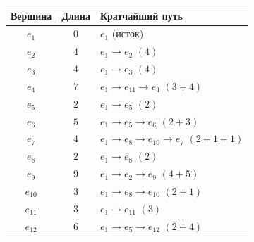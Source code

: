 \documentclass[a4paper,12pt]{article}
\begin{document}
\begin{center}
	\renewcommand{\arraystretch}{1.4}
	\begin{tabular}{|c|c|l|}
		\hline
		\textbf{Вершина} & \textbf{Длина} & \textbf{Кратчайший путь}                         \\
		\hline
		$e_1$            & $0$            & $e_1$ (исток)                                    \\
		$e_2$            & $4$            & $e_1 \to e_2$ \quad $(4)$                        \\
		$e_3$            & $4$            & $e_1 \to e_3$ \quad $(4)$                        \\
		$e_4$            & $7$            & $e_1 \to e_{11} \to e_4$ \quad $(3+4)$           \\
		$e_5$            & $2$            & $e_1 \to e_5$ \quad $(2)$                        \\
		$e_6$            & $5$            & $e_1 \to e_5 \to e_6$ \quad $(2+3)$              \\
		$e_7$            & $4$            & $e_1 \to e_8 \to e_{10} \to e_7$ \quad $(2+1+1)$ \\
		$e_8$            & $2$            & $e_1 \to e_8$ \quad $(2)$                        \\
		$e_9$            & $9$            & $e_1 \to e_2 \to e_9$ \quad $(4+5)$              \\
		$e_{10}$         & $3$            & $e_1 \to e_8 \to e_{10}$ \quad $(2+1)$           \\
		$e_{11}$         & $3$            & $e_1 \to e_{11}$ \quad $(3)$                     \\
		$e_{12}$         & $6$            & $e_1 \to e_5 \to e_{12}$ \quad $(2+4)$           \\
		\hline
	\end{tabular}
\end{center}
\end{document}
